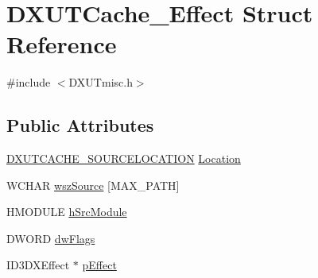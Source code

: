 \hypertarget{struct_d_x_u_t_cache___effect}{
\section{DXUTCache\_\-Effect Struct Reference}
\label{struct_d_x_u_t_cache___effect}
}


{\ttfamily \#include $<$DXUTmisc.h$>$}\subsection*{Public Attributes}
\begin{DoxyCompactItemize}
\item 
\hyperlink{_d_x_u_tmisc_8h_a76e8535d530eae9300822134c181e733}{DXUTCACHE\_\-SOURCELOCATION} \hyperlink{struct_d_x_u_t_cache___effect_aab729cdf923009665f4fcd973f9e27b3}{Location}
\item 
WCHAR \hyperlink{struct_d_x_u_t_cache___effect_a3b8d57991e52fa9ec6f91cf5d94b462c}{wszSource} \mbox{[}MAX\_\-PATH\mbox{]}
\item 
HMODULE \hyperlink{struct_d_x_u_t_cache___effect_aee7a31cf568cb76010fcaae9b584ec1c}{hSrcModule}
\item 
DWORD \hyperlink{struct_d_x_u_t_cache___effect_a4e62f6d5c595fbb5a26dae587ddcfdfb}{dwFlags}
\item 
ID3DXEffect $\ast$ \hyperlink{struct_d_x_u_t_cache___effect_a6783ea0da06d165ef3a7de16b0ba3aad}{pEffect}
\end{DoxyCompactItemize}


